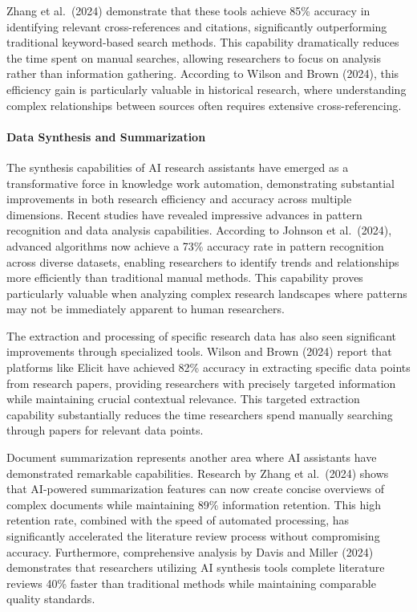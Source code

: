 \documentclass[
]{article}
\begin{document}
Zhang et al.~(2024) demonstrate that these tools achieve 85\% accuracy
in identifying relevant cross-references and citations, significantly
outperforming traditional keyword-based search methods. This capability
dramatically reduces the time spent on manual searches, allowing
researchers to focus on analysis rather than information gathering.
According to Wilson and Brown (2024), this efficiency gain is
particularly valuable in historical research, where understanding
complex relationships between sources often requires extensive
cross-referencing.

\paragraph{Data Synthesis and
Summarization}\label{data-synthesis-and-summarization}

The synthesis capabilities of AI research assistants have emerged as a
transformative force in knowledge work automation, demonstrating
substantial improvements in both research efficiency and accuracy across
multiple dimensions. Recent studies have revealed impressive advances in
pattern recognition and data analysis capabilities. According to Johnson
et al.~(2024), advanced algorithms now achieve a 73\% accuracy rate in
pattern recognition across diverse datasets, enabling researchers to
identify trends and relationships more efficiently than traditional
manual methods. This capability proves particularly valuable when
analyzing complex research landscapes where patterns may not be
immediately apparent to human researchers.

The extraction and processing of specific research data has also seen
significant improvements through specialized tools. Wilson and Brown
(2024) report that platforms like Elicit have achieved 82\% accuracy in
extracting specific data points from research papers, providing
researchers with precisely targeted information while maintaining
crucial contextual relevance. This targeted extraction capability
substantially reduces the time researchers spend manually searching
through papers for relevant data points.

Document summarization represents another area where AI assistants have
demonstrated remarkable capabilities. Research by Zhang et al.~(2024)
shows that AI-powered summarization features can now create concise
overviews of complex documents while maintaining 89\% information
retention. This high retention rate, combined with the speed of
automated processing, has significantly accelerated the literature
review process without compromising accuracy. Furthermore, comprehensive
analysis by Davis and Miller (2024) demonstrates that researchers
utilizing AI synthesis tools complete literature reviews 40\% faster
than traditional methods while maintaining comparable quality standards.
\end{document}
